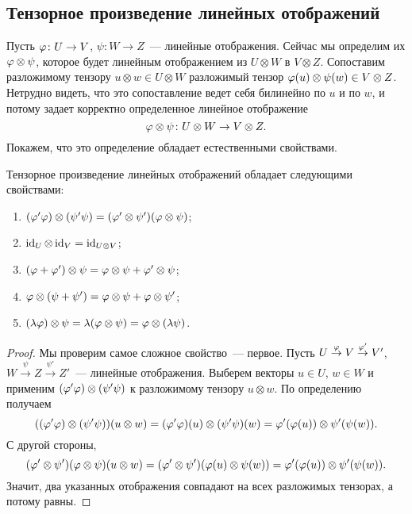 \subsection{Тензорное произведение линейных отображений}


Пусть $\varphi\colon U\to V$, $\psi\colon W\to Z$~--- линейные
отображения. Сейчас мы определим их 
$\varphi\otimes\psi$, которое будет линейным отображением из $U\otimes W$
в $V\otimes Z$.
Сопоставим разложимому тензору $u\otimes w\in U\otimes W$
разложимый тензор $\varphi(u)\otimes\psi(w)\in V\otimes Z$. Нетрудно
видеть, что это сопоставление ведет себя билинейно по $u$ и по $w$, и
потому задает корректно определенное линейное отображение
$$\varphi\otimes\psi\colon U\otimes W\to V\otimes Z.$$
Покажем, что это определение обладает естественными свойствами.

\begin{theorem}\label{thm:tensor_product_maps}
Тензорное произведение линейных отображений обладает следующими
свойствами:
\begin{enumerate}
\item $(\varphi'\varphi)\otimes(\psi'\psi) =
  (\varphi'\otimes\psi')(\varphi\otimes\psi)$;
\item $\operatorname{id}_U\otimes\operatorname{id}_V = \operatorname{id}_{U\otimes V}$;
\item $(\varphi+\varphi')\otimes\psi = \varphi\otimes\psi + \varphi'\otimes\psi$;
\item $\varphi\otimes(\psi+\psi') = \varphi\otimes\psi + \varphi\otimes\psi'$;
\item $(\lambda\varphi)\otimes\psi = \lambda(\varphi\otimes\psi) = \varphi\otimes(\lambda\psi)$.
\end{enumerate}
\end{theorem}
\begin{proof}
Мы проверим самое сложное свойство~--- первое.
Пусть $U\stackrel{\varphi}{\to} V \stackrel{\varphi'}{\to} V'$,
$W\stackrel{\psi}{\to} Z \stackrel{\psi'}{\to} Z'$~--- линейные
отображения.
Выберем векторы $u\in U$, $w\in W$ и применим
$(\varphi'\varphi)\otimes(\psi'\psi)$ к разложимому тензору $u\otimes w$. По
определению получаем
$$
((\varphi'\varphi)\otimes(\psi'\psi))(u\otimes w) =
(\varphi'\varphi)(u)\otimes(\psi'\psi)(w) =
\varphi'(\varphi(u))\otimes\psi'(\psi(w)).
$$
С другой стороны,
$$
(\varphi'\otimes\psi')(\varphi\otimes\psi)(u\otimes w) =
(\varphi'\otimes\psi')(\varphi(u)\otimes\psi(w)) =
\varphi'(\varphi(u))\otimes\psi'(\psi(w)).
$$
Значит, два указанных отображения совпадают на всех разложимых
тензорах, а потому равны.
\end{proof}

